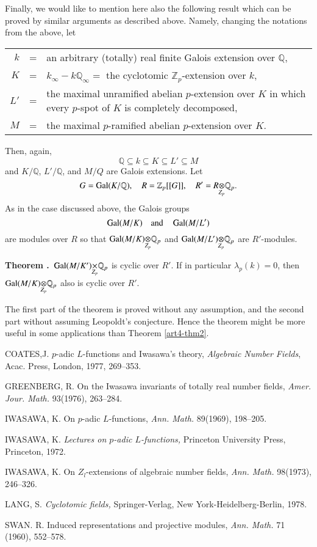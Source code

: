 Finally, we would like to mention here also the following result which can be proved by similar arguments as described above. Namely, changing the notations from the above, let
\begin{center}
\begin{tabular}{r@{\;}c@{\;}p{8.5cm}}
$k$ & = & an arbitrary (totally) real finite Galois extension over $\mathbb{Q}$,\\
$K$ & = & $k_{\infty}-k\mathbb{Q}_{\infty}=$ the cyclotomic $\mathbb{Z}_{p}$-extension over $k$,\\
$L'$ & = & the maximal unramified abelian $p$-extension over $K$ in which every $p$-spot of $K$ is completely decomposed,\\
$M$ & = & the maximal $p$-ramified abelian $p$-extension over $K$.
\end{tabular}
\end{center}
Then, again,
$$
\mathbb{Q}\subseteq k\subseteq K\subseteq L'\subseteq M
$$
and $K/\mathbb{Q}$, $L'/\mathbb{Q}$, and $M/Q$ are Galois extensions. Let
$$
G=\Gal(K/\mathbb{Q}),\quad R=\mathbb{Z}_{p}[[G]],\quad R'=\foprod{R}{\mathbb{Q}_{p}}{Z_{p}}.
$$
As in the case discussed above, the Galois groups 
$$
\operatorname{Gal}(M/K)\quad\text{and}\quad \operatorname{Gal}(M/L')
$$
are modules over $R$ so that $\foprod{\Gal(M/K)}{\mathbb{Q}_{p}}{Z_{p}}$ and $\foprod{\Gal(M/L')}{\mathbb{Q}_{p}}{Z_{p}}$ are $R'$-modules.

\medskip
\noindent
{\bf Theorem .\label{art4-thm4}}~{$\fprod{\Gal(M/K')}{\mathbb{Q}_{p}}{Z_{p}}$ is cyclic over $R'$. If in particular $\lambda_{p}(k)=0$, then $\foprod{\Gal(M/K)}{\mathbb{Q}_{p}}{Z_{p}}$ also is cyclic over $R'$.}
\medskip

The first part of the theorem is proved without any assumption, and the second part without assuming Leopoldt's conjecture. Hence the theorem might be more useful in some applications than Theorem \ref{art4-thm2}.

\begin{thebibliography}{99}
 COATES,\pageoriginale J. $p$-adic $L$-functions and Iwasawa's theory, {\em Algebraic Number Fields}, Acac. Press, London, 1977, 269--353.

 GREENBERG, R. On the Iwasawa invariants of totally real number fields, {\em Amer. Jour. Math.} 93(1976), 263--284.

 IWASAWA, K. On $p$-adic $L$-functions, {\em Ann. Math.} 89(1969), 198--205.

 IWASAWA, K. {\em Lectures on $p$-adic $L$-functions,} Princeton University Press, Princeton, 1972.

 IWASAWA, K. On $Z_{l}$-extensions of algebraic number fields, {\em Ann. Math.} 98(1973), 246--326.

 LANG, S. {\em Cyclotomic fields,} Springer-Verlag, New York-Heidelberg-Berlin, 1978.

 SWAN. R. Induced representations and projective modules, {\em Ann. Math.} 71 (1960), 552--578.

\end{thebibliography}
